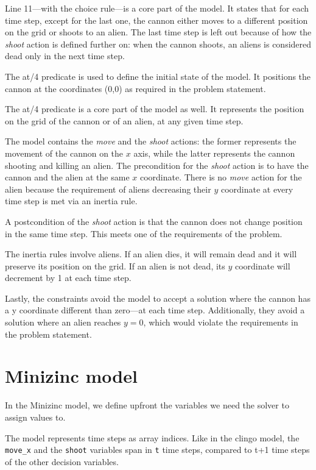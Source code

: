 \documentclass[11pt]{article}
\begin{document}
Line 11---with the choice rule---is a core part of the model.
It states that for each time step, except for the last one, the cannon either moves to a different position on the grid or shoots to an alien.
The last time step is left out because of how the \textit{shoot} action is defined further on: when the cannon shoots, an aliens is considered dead only in the next time step.

The at/4 predicate is used to define the initial state of the model. It positions the cannon at the coordinates (0,0) as required in the problem statement.

The at/4 predicate is a core part of the model as well.
It represents the position on the grid of the cannon or of an alien, at any given time step.

The model contains the \textit{move} and the \textit{shoot} actions: the former represents the movement of the cannon on the $x$ axis, while the latter represents the cannon shooting and killing an alien.
The precondition for the \textit{shoot} action is to have the cannon and the alien at the same $x$ coordinate.
There is no \textit{move} action for the alien because the requirement of aliens decreasing their $y$ coordinate at every time step is met via an inertia rule.

A postcondition of the \textit{shoot} action is that the cannon does not change position in the same time step.
This meets one of the requirements of the problem.

The inertia rules involve aliens.
If an alien dies, it will remain dead and it will preserve its position on the grid.
If an alien is not dead, its $y$ coordinate will decrement by 1 at each time step.

Lastly, the constraints avoid the model to accept a solution where the cannon has a y coordinate different than zero---at each time step.
Additionally, they avoid a solution where an alien reaches $y = 0$, which would violate the requirements in the problem statement.


\section{Minizinc model}

In the Minizinc model, we define upfront the variables we need the solver to assign values to.

The model represents time steps as array indices.
Like in the clingo model, the \texttt{move\_x} and the \texttt{shoot} variables span in \texttt{t} time steps, compared to t+1 time steps of the other decision variables.
\end{document}
